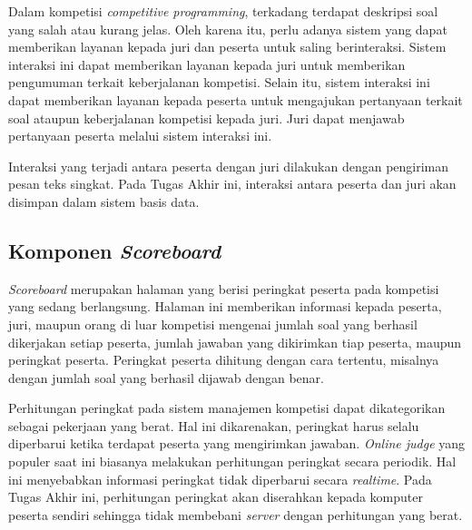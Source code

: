 \par Dalam kompetisi \textit{competitive programming}, terkadang terdapat deskripsi soal yang salah atau kurang jelas. Oleh karena itu, perlu adanya sistem yang dapat memberikan layanan kepada juri dan peserta untuk saling berinteraksi. Sistem interaksi ini dapat memberikan layanan kepada juri untuk memberikan pengumuman terkait keberjalanan kompetisi. Selain itu, sistem interaksi ini dapat memberikan layanan kepada peserta untuk mengajukan pertanyaan terkait soal ataupun keberjalanan kompetisi kepada juri. Juri dapat menjawab pertanyaan peserta melalui sistem interaksi ini.

\par Interaksi yang terjadi antara peserta dengan juri dilakukan dengan pengiriman pesan teks singkat. Pada Tugas Akhir ini, interaksi antara peserta dan juri akan disimpan dalam sistem basis data.

\subsection{Komponen \textit{Scoreboard}}

\par \textit{Scoreboard} merupakan halaman yang berisi peringkat peserta pada kompetisi yang sedang berlangsung. Halaman ini memberikan informasi kepada peserta, juri, maupun orang di luar kompetisi mengenai jumlah soal yang berhasil dikerjakan setiap peserta, jumlah jawaban yang dikirimkan tiap peserta, maupun peringkat peserta. Peringkat peserta dihitung dengan cara tertentu, misalnya dengan jumlah soal yang berhasil dijawab dengan benar.

\par Perhitungan peringkat pada sistem manajemen kompetisi dapat dikategorikan sebagai pekerjaan yang berat. Hal ini dikarenakan, peringkat harus selalu diperbarui ketika terdapat peserta yang mengirimkan jawaban. \textit{Online judge} yang populer saat ini biasanya melakukan perhitungan peringkat secara periodik. Hal ini menyebabkan informasi peringkat tidak diperbarui secara \textit{realtime}. Pada Tugas Akhir ini, perhitungan peringkat akan diserahkan kepada komputer peserta sendiri sehingga tidak membebani \textit{server} dengan perhitungan yang berat.
